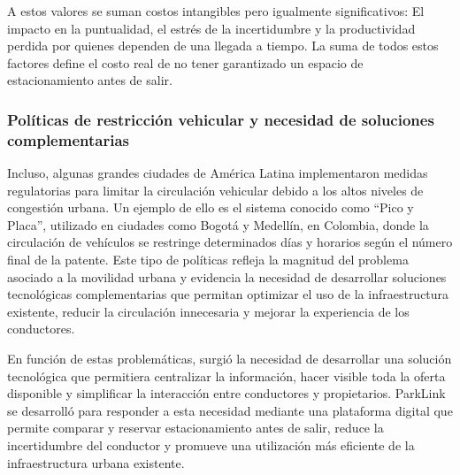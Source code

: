 \begin{table}[H]
\centering
\renewcommand{\arraystretch}{1.5}
\caption{Costo estimado por evento de búsqueda de estacionamiento en CABA (2026)}
\label{tab:costo_insatisfaccion}
\end{table}

A estos valores se suman costos intangibles pero igualmente significativos: El impacto en la puntualidad, el estrés de la incertidumbre y la productividad perdida por quienes dependen de una llegada a tiempo. La suma de todos estos factores define el costo real de no tener garantizado un espacio de estacionamiento antes de salir.

\subsubsection{Políticas de restricción vehicular y necesidad de soluciones complementarias}

Incluso, algunas grandes ciudades de América Latina implementaron medidas regulatorias para limitar la circulación vehicular debido a los altos niveles de congestión urbana. Un ejemplo de ello es el sistema conocido como ``Pico y Placa'', utilizado en ciudades como Bogotá y Medellín, en Colombia, donde la circulación de vehículos se restringe determinados días y horarios según el número final de la patente. Este tipo de políticas refleja la magnitud del problema asociado a la movilidad urbana y evidencia la necesidad de desarrollar soluciones tecnológicas complementarias que permitan optimizar el uso de la infraestructura existente, reducir la circulación innecesaria y mejorar la experiencia de los conductores.

En función de estas problemáticas, surgió la necesidad de desarrollar una solución tecnológica que permitiera centralizar la información, hacer visible toda la oferta disponible y simplificar la interacción entre conductores y propietarios. ParkLink se desarrolló para responder a esta necesidad mediante una plataforma digital que permite comparar y reservar estacionamiento antes de salir, reduce la incertidumbre del conductor y promueve una utilización más eficiente de la infraestructura urbana existente.

